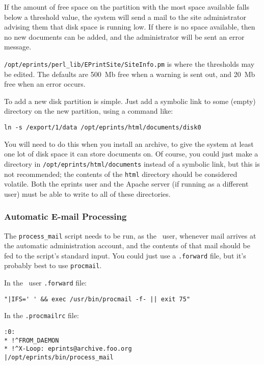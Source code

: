 If the amount of free space on the partition with the most space available falls below a threshold value, the system will send a mail to the site administrator advising them that disk space is running low. If there is no space available, then no new documents can be added, and the administrator will be sent an error message.

{\tt /opt/eprints/perl\_lib/EPrintSite/SiteInfo.pm} is where the thresholds may be edited. The defaults are 500~Mb free when a warning is sent out, and 20~Mb free when an error occurs.

To add a new disk partition is simple. Just add a symbolic link to some (empty) directory on the new partition, using a command like:

\begin{verbatim}
ln -s /export/1/data /opt/eprints/html/documents/disk0
\end{verbatim}

You will need to do this when you install an \eprints archive, to give the system at least one lot of disk space it can store documents on. Of course, you could just make a directory in {\tt /opt/eprints/html/documents} instead of a symbolic link, but this is not recommended; the contents of the {\tt html} directory should be considered volatile. Both the eprints user and the Apache server (if running as a different user) must be able to write to all of these directories.


\subsubsection{Automatic E-mail Processing}

The {\tt process\_mail} script needs to be run, as the \eprints\ user, whenever mail arrives at the automatic administration account, and the contents of that mail should be fed to the script's standard input. You could just use a {\tt .forward} file, but it's probably best to use {\tt procmail}.

In the \eprints\ user {\tt .forward} file:

\begin{verbatim}
"|IFS=' ' && exec /usr/bin/procmail -f- || exit 75"
\end{verbatim}

In the {\tt .procmailrc} file:

\begin{verbatim}
:0:
* !^FROM_DAEMON
* !^X-Loop: eprints@archive.foo.org
|/opt/eprints/bin/process_mail
\end{verbatim}

